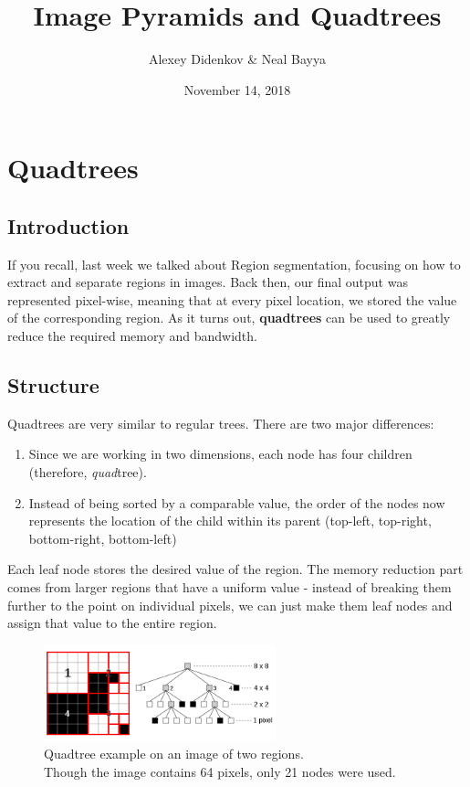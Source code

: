 \documentclass{article}
\title{Image Pyramids and Quadtrees}
\author{Alexey Didenkov \& Neal Bayya}
\date{November 14, 2018}
\begin{document}
\maketitle

\section{Quadtrees}

\subsection{Introduction}
If you recall, last week we talked about Region segmentation, focusing on how to extract and separate regions in images. Back then, our final output was represented pixel-wise, meaning that at every pixel location, we stored the value of the corresponding region. As it turns out, \textbf{quadtrees} can be used to greatly reduce the required memory and bandwidth.

\subsection{Structure}
Quadtrees are very similar to regular trees. There are two major differences:
\begin{enumerate}
  \item Since we are working in two dimensions, each node has four children (therefore, \textit{quad}tree).
  \item Instead of being sorted by a comparable value, the order of the nodes now represents the location of the child within its parent (top-left, top-right, bottom-right, bottom-left)
\end{enumerate}
Each leaf node stores the desired value of the region. The memory reduction part comes from larger regions that have a uniform value - instead of breaking them further to the point on individual pixels, we can just make them leaf nodes and assign that value to the entire region.
\begin{figure}[!htb]
    \begin{center}
        \includegraphics[width=0.6\textwidth]{quadtree.png}
        \vspace{-10pt}
        \captionsetup{justification=centering}
        \caption{Quadtree example on an image of two regions.\\
        Though the image contains 64 pixels, only 21 nodes were used.}
    \end{center}
    \vspace{-25pt}
\end{figure}
\end{document}
